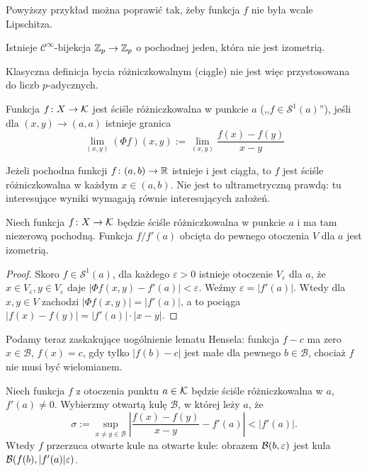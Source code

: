 Powyższy przykład można poprawić tak, żeby funkcja $f$ nie była wcale Lipschitza.

\begin{przyklad}
	Istnieje $\mathcal C^\infty$-bijekcja $\mathbb Z_p \to \mathbb Z_p$ o pochodnej jeden, która nie jest izometrią.
\end{przyklad}


Klasyczna definicja bycia różniczkowalnym (ciągle) nie jest  więc przystosowana do liczb $p$-adycznych.

\begin{definicja}
	Funkcja $f \colon X \to \mathcal K $ jest ściśle różniczkowalna w punkcie $a$ (,,$f \in \mathcal S^1(a)$''), jeśli dla $(x,y) \to (a,a)$ istnieje granica
	\[
		\lim_{(x,y)} (\Phi f)(x,y) := \lim_{(x,y)} \frac{f(x)-f(y)}{x-y}
	\]
\end{definicja}

Jeżeli pochodna funkcji $f \colon (a,b) \to \mathbb R$ istnieje i jest ciągła, to $f$ jest ściśle różniczkowalna w każdym $x \in (a,b)$.
Nie jest to ultrametryczną prawdą: tu interesujące wyniki wymagają równie interesujących założeń.

\begin{fakt}
	Niech funkcja $f \colon X \to \mathcal K$ będzie ściśle różniczkowalna w punkcie $a$ i ma tam niezerową pochodną.
	Funkcja $f / f'(a)$ obcięta do pewnego otoczenia $V$ dla $a$ jest izometrią.
\end{fakt}

\begin{proof}
	Skoro $f \in \mathcal S^1 (a)$, dla każdego $\varepsilon > 0$ istnieje otoczenie $V_\varepsilon$ dla $a$, że
	$
		x \in V_\varepsilon, y \in V_\varepsilon$ daje $|\Phi f(x,y) - f'(a)| < \varepsilon.
	$
	Weźmy $\varepsilon = |f'(a)|$.
	Wtedy dla $x, y \in V$ zachodzi $|\Phi f(x,y)| = |f'(a)|$, a to pociąga $|f(x) - f(y)| = |f'(a)| \cdot |x-y|$.
\end{proof}

Podamy teraz zaskakujące uogólnienie lematu Hensela: funkcja $f-c$ ma zero $x \in \mathcal B$, $f(x) = c$, gdy tylko $|f(b)-c|$ jest małe dla pewnego $b \in \mathcal B$, chociaż $f$ nie musi być wielomianem.

\begin{fakt}
	Niech funkcja $f$ z otoczenia punktu $a \in \mathcal K$ będzie ściśle różniczkowalna w $a$, $f'(a) \neq 0$.
	Wybierzmy otwartą kulę $\mathcal B$, w której leży $a$, że
	\[
		\sigma := \sup_{x\neq y \in \mathcal B} \left|\frac{f(x)-f(y)}{x-y} - f'(a)\right| < |f'(a)|.
	\]
	Wtedy $f$ przerzuca otwarte kule na otwarte kule: obrazem $\mathcal B(b, \varepsilon)$ jest kula $\mathcal B(f(b), |f'(a)| \varepsilon)$.
\end{fakt}

